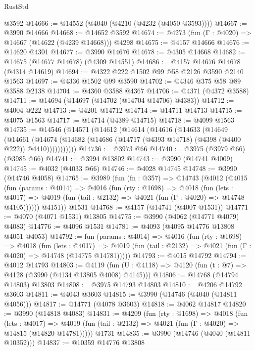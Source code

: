 \begin{lexlean}{RustStd}
\begin{coremodule}
{\begin{coremodule}
{{{{{{{{{{{{{{{{    @3592
@14666 := @14552 (@4040 (@4210 (@4232 (@4050 @3593))))
@14667 := @3990 @14666
@14668 := @14652 @3592
@14674 := @4273 (fun (Γ : @4020) => @14667 (@14622 (@4239 @14668))) @4298
@14675 := @4157 @14666
@14676 := @14620 @4301
@14677 := @3990 @14676
@14678 := @4305 @14668
@14682 := @14675 (@14677 @14678) (@4309 @14551)
@14686 := @4157 @14676 @14678 (@4314 @14619)
@14694 := @4322 @222 @1502 @99 @58 @2126 @3590 @2140 @1563
@14697 := @4336 @1502 @99 @3590
@14702 := @4346 @375 @58 @89 @3588 @2138
@14704 := @4360 @3588 @4367
@14706 := @4371 (@4372 @3588)
@14711 := @14694 (@14697 (@14702 (@14704 @14706) @4383))
@14712 := @4004 @222
@14713 := @4201 @14712
@14714 := @14711 @14713
@14715 := @4075 @1563
@14717 := @14714 (@4389 @14715)
@14718 := @4099 @1563
@14735 := @14546
    (@14571
      (@14612
        (@14614
          (@14616
            (@14633
              (@14649
                (@14661
                  (@14674
                    (@14682 (@14686 (@14717 (@4393 @14718) (@4398 (@4400 @222)) @4410)))))))))))
@14736 := @3973 @66
@14740 := @3975 (@3979 @66) (@3985 @66)
@14741 := @3994 @13802
@14743 := @3990 (@14741 @4009)
@14745 := @4032 (@4033 @66)
@14746 := @4028 @14745
@14748 := @3990 (@14746 @4058)
@14765 := @3989
    (fun (fn : @357) =>
    @14743
      (@4012
        (@4015
          (fun (params : @4014) =>
          @4016
            (fun (rty : @1698) =>
            @4018
              (fun (lets : @4017) =>
              @4019 (fun (tail : @2132) => @4021 (fun (Γ : @4020) => @14748 @4105))))))
        @4151))
    @1531
@14768 := @4157 (@14741 (@4007 @1531))
@14771 := @4070 (@4071 @1531) @13805
@14775 := @3990 (@4062 (@14771 @4079) @4083)
@14776 := @4096 @1531
@14781 := @4093 (@4095 @14776 @13808 @4051 @4053)
@14792 := fun (params : @4014) =>
  @4016
    (fun (rty : @1698) =>
    @4018
      (fun (lets : @4017) =>
      @4019 (fun (tail : @2132) => @4021 (fun (Γ : @4020) => @14748 (@14775 @14781)))))
@14793 := @4015 @14792
@14794 := @4012 @14793
@14803 := @4119
    (fun (U : @4118) => @4120 (fun (t : @7) => @4128 (@3990 (@4134 @13805 @4008) @4145)))
@14806 := @14768 (@14794 @14803) @13803
@14808 := @3975 @14793 @14803
@14810 := @4206 @14792 @3603
@14811 := @4043 @3603
@14815 := @3990 (@14746 (@4040 (@14811 @4056)))
@14817 := @14771 (@4078 @3603)
@14818 := @4062 @14817
@14820 := @3990 (@14818 @4083)
@14831 := @4209
    (fun (rty : @1698) =>
    @4018
      (fun (lets : @4017) =>
      @4019 (fun (tail : @2132) => @4021 (fun (Γ : @4020) => @14815 (@14820 @14781)))))
    @1731
@14835 := @3990 (@14746 (@4040 (@14811 @10352)))
@14837 := @10359 @14776 @13808
}}}}}}}}}}}}}}}}
\end{coremodule}}
\end{coremodule}
\end{lexlean}

